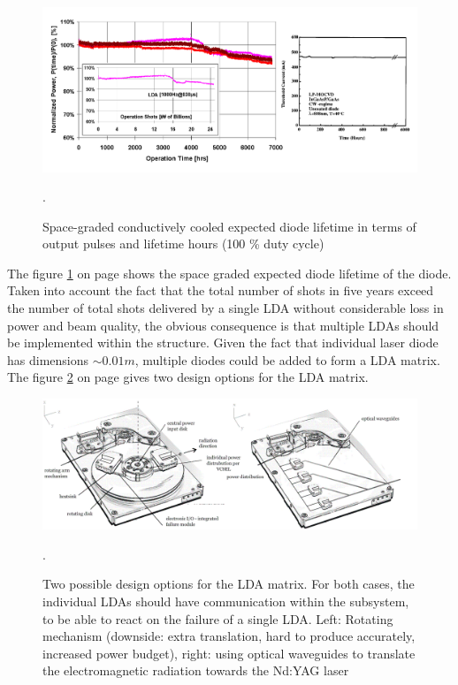 \begin{figure}[ht!]
\centering
\includegraphics[scale=0.4]{chapters/img/diode_lifetime.png} 
\caption{Space-graded conductively cooled expected diode lifetime in terms of output pulses and lifetime hours (100 \% duty cycle)}.
\label{fig:diode_life_time}
\end{figure}

The figure \ref{fig:diode_life_time} on page \pageref{fig:diode_life_time} shows the space graded expected diode lifetime of the diode. Taken into account the fact that the total number of shots in five years exceed the number of total shots delivered by a single \acs{LDA} without considerable loss in power and beam quality, the obvious consequence is that multiple \acp{LDA} should be implemented within the structure. Given the fact that individual \acs{laser} diode has dimensions $\sim0.01 m$, multiple diodes could be added to form a \acs{LDA} matrix. The figure \ref{fig:laser_design_option} on page \pageref{fig:laser_design_option} gives two design options for the \acs{LDA} matrix. 

\begin{figure}[ht!]
\centering
\includegraphics[scale=0.4]{chapters/img/Diode_laser.png} 
\caption[Two possible design options for the \acs{LDA} matrix]{Two possible design options for the \acs{LDA} matrix. For both cases, the individual \acp{LDA} should have communication within the subsystem, to be able to react on the failure of a single \acs{LDA}. Left: Rotating mechanism (downside: extra translation, hard to produce accurately, increased power budget), right: using optical waveguides to translate the electromagnetic radiation towards the Nd:YAG \acs{laser}}.
\label{fig:laser_design_option}
\end{figure}


